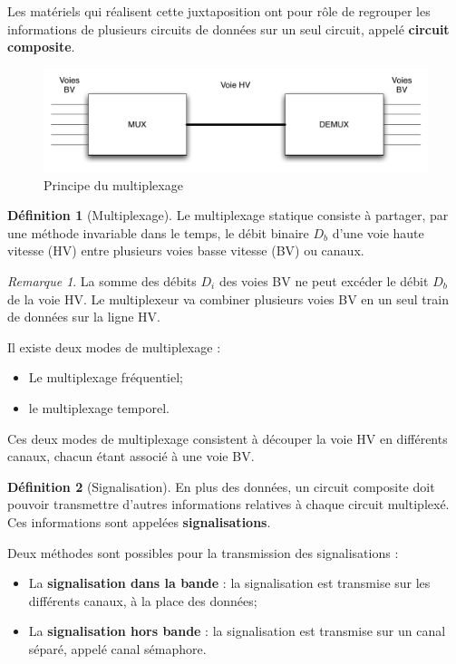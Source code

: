 \documentclass[11pt,english,french]{scrreprt}
\theoremstyle{remark}
\newtheorem*{rem*}{Remarque}
\theoremstyle{definition}
\newtheorem*{def*}{Définition}
\begin{document}
 Les matériels qui réalisent cette juxtaposition ont pour rôle de regrouper les informations de plusieurs circuits de données sur un seul circuit, appelé \textbf{circuit composite}.

\begin{figure}[h!]
	\center
	\includegraphics[scale=.75]{graphes/multiplexage}
	\caption{Principe du multiplexage}
\end{figure}

\begin{def*}[Multiplexage]
	Le multiplexage statique consiste à partager, par une méthode invariable dans le temps, le débit binaire $D_b$ d'une voie haute vitesse (HV) entre plusieurs voies basse vitesse (BV) ou canaux. 
\end{def*}

\begin{rem*}
	La somme des débits $D_i$ des voies BV ne peut excéder le débit $D_b$ de la voie HV. Le multiplexeur va combiner plusieurs voies BV en un seul train de données sur la ligne HV.
\end{rem*}

Il existe deux modes de multiplexage :\begin{itemize}
	\item Le multiplexage fréquentiel;
	\item le multiplexage temporel.
\end{itemize}

Ces deux modes de multiplexage consistent à découper la voie HV en différents canaux, chacun
étant associé à une voie BV.

\begin{def*}[Signalisation]
	En plus des données, un circuit composite doit pouvoir transmettre d'autres informations relatives à chaque circuit multiplexé. Ces informations sont appelées \textbf{signalisations}. 
	
	Deux méthodes sont possibles pour la transmission des signalisations :\begin{itemize}
		\item La \textbf{signalisation dans la bande} : la signalisation est transmise sur les différents canaux, à la place des données;
		\item La \textbf{signalisation hors bande} : la signalisation est transmise sur un canal séparé, appelé canal sémaphore.
	\end{itemize}	
\end{def*}
\end{document}
